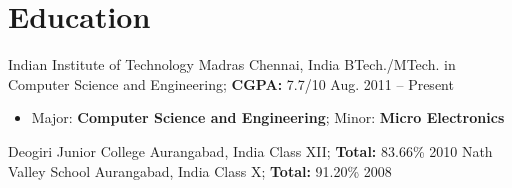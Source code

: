 \documentclass[letterpaper,11pt]{resume}
\author{Siddhant Sunilkumar Mutha}
\begin{document}
\resumeheader
\section{Education}
\begin{itemize}
    \credential
    {{Indian Institute of Technology Madras}}
    {Chennai, India}
    {{BTech./MTech. in Computer Science
      and Engineering}; {{\bf CGPA:} 7.7/10}
      }
    {Aug. 2011 -- Present}
 { \begin{itemize}
      \item{Major: \textbf{Computer Science and Engineering}; Minor: \textbf{Micro Electronics}}
      \end{itemize}
    }
    \bigskip
   \credential
    {{Deogiri Junior College}}
    {Aurangabad, India}
    {{Class XII}; {{\bf Total:} 83.66\%}
     }
    {2010}
   \bigskip
   \credential
    {{Nath Valley School}}
    {Aurangabad, India}
    {{Class X}; {{\bf Total:} 91.20\%}}
    {2008}
   \bigskip 

\end{itemize}
\end{document}
